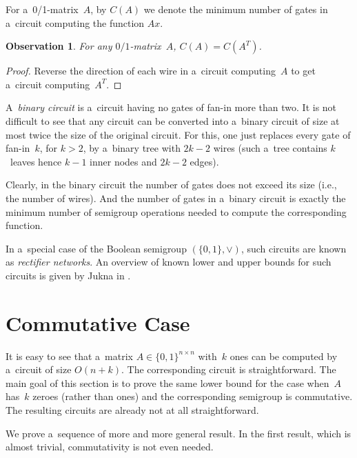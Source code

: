 \documentclass[11pt,letterpaper]{article}
\newtheorem{observation}{Observation}
\begin{document}
For a~0/1-matrix~$A$, by $C(A)$ we denote the minimum
number of gates in a~circuit computing the function $Ax$.
\begin{observation}\label{obs:transpose}
For any $0/1$-matrix~$A$, $C(A)=C(A^T)$.
\end{observation}
\begin{proof}
Reverse the direction of each wire in a~circuit computing~$A$ to get a~circuit computing~$A^T$.
\end{proof}


A~{\em binary circuit} is a~circuit having no gates of fan-in more than two. It is not difficult to see that any circuit can be converted into a~binary circuit of size at most twice the size of the original circuit. For this, one just replaces every gate of fan-in~$k$, for $k>2$, by a~binary tree with $2k-2$ wires (such a~tree contains $k$~leaves hence $k-1$ inner nodes and $2k-2$ edges).

Clearly, in the binary circuit the number of gates does not exceed its size (i.e., the number of wires). And the number of gates in a~binary circuit is exactly the minimum number of semigroup operations needed to compute the corresponding function.

In a~special case of the Boolean semigroup $(\{0,1\}, \lor)$, such circuits are known as {\em rectifier networks}. An overview of known lower and upper bounds for such circuits is given by Jukna in \cite[Section~13.6]{DBLP:books/daglib/0028687}.

\section{Commutative Case}\label{sec-commutative}
It is easy to see that a~matrix $A \in \{0,1\}^{n \times n}$
with~$k$ ones can be computed by a~circuit of size $O(n+k)$.
The corresponding circuit is straightforward. The main goal of
this section is to prove the same lower bound for the case
when~$A$ has~$k$ zeroes (rather than ones) and the
corresponding semigroup is commutative. The resulting circuits
are already not at all straightforward.

We prove a~sequence of more and more general result. In the first result, which is almost trivial,  commutativity is not even needed.

\end{document}
